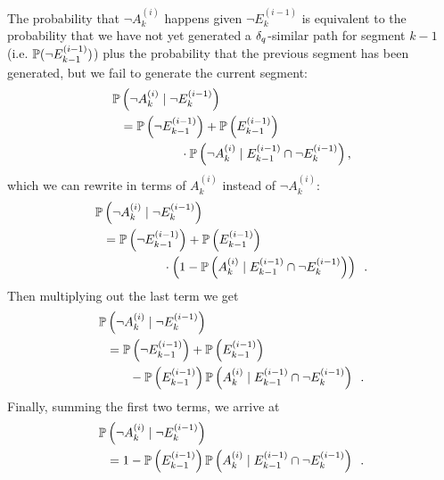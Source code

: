 The probability that $\neg A^{(i)}_k$ happens given $\neg E^{(i-1)}_k$ is equivalent to the probability that we have not yet generated a $\delta_q$-similar path for segment $k-1$ (i.e. $\mathbb{P}( \neg E^{(i-1)}_{k-1} )$) plus the probability that the previous segment has been generated, but we fail to generate the current segment:
\begin{equation}
\begin{split}
    \mathbb{P}&\left( \neg A^{(i)}_k \mid \neg E^{(i-1)}_k \right) \\
    &= \mathbb{P}\left( \neg E^{(i-1)}_{k-1} \right) + \mathbb{P}\left( E^{(i-1)}_{k-1} \right) \\
    &  \hspace{1.7cm} \cdot \mathbb{P}\left( \neg A_k^{(i)} \mid E_{k-1}^{(i-1)} \cap \neg E_k^{(i-1)} \right), \\
\end{split}
\end{equation}
which we can rewrite in terms of $A_k^{(i)}$ instead of $\neg A_k^{(i)}$:
\begin{equation}
\begin{split}
    \mathbb{P}&\left( \neg A^{(i)}_k \mid \neg E^{(i-1)}_k \right) \\
       &= \mathbb{P}\left( \neg E^{(i-1)}_{k-1} \right) + \mathbb{P}\left( E^{(i-1)}_{k-1} \right) \\
       &  \hspace{1.7cm} \cdot \left(1 - \mathbb{P}\left( A_k^{(i)} \mid E_{k-1}^{(i-1)} \cap \neg E_k^{(i-1)} \right) \right) \enspace . \\
\end{split}
\end{equation}
Then multiplying out the last term we get
\begin{equation}
\begin{split}
    \mathbb{P}&\left( \neg A^{(i)}_k \mid \neg E^{(i-1)}_k \right) \\
       &= \mathbb{P}\left( \neg E^{(i-1)}_{k-1} \right) + \mathbb{P}\left( E^{(i-1)}_{k-1} \right) \\
       &  \hspace{0.65cm} - \mathbb{P}\left( E^{(i-1)}_{k-1} \right) \mathbb{P}\left( A_k^{(i)} \mid E_{k-1}^{(i-1)} \cap \neg E_k^{(i-1)} \right) \enspace . \\
\end{split}
\end{equation}
Finally, summing the first two terms, we arrive at
\begin{equation}
\begin{split}
    \mathbb{P}&\left( \neg A^{(i)}_k \mid \neg E^{(i-1)}_k \right) \\
       &= 1 - \mathbb{P}\left( E^{(i-1)}_{k-1} \right) \mathbb{P}\left( A_k^{(i)} \mid E_{k-1}^{(i-1)} \cap \neg E_k^{(i-1)} \right) \enspace .
\end{split}
\end{equation}
